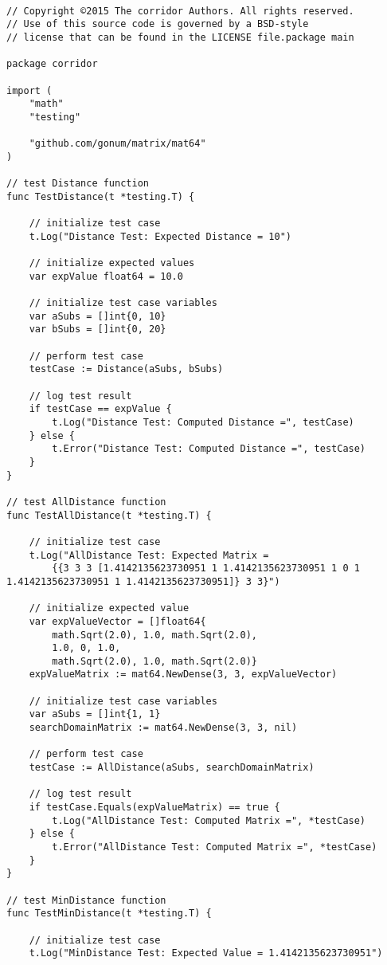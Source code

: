 \begin{lstlisting}[basicstyle=\tiny]

// Copyright ©2015 The corridor Authors. All rights reserved.
// Use of this source code is governed by a BSD-style
// license that can be found in the LICENSE file.package main

package corridor

import (
	"math"
	"testing"

	"github.com/gonum/matrix/mat64"
)

// test Distance function
func TestDistance(t *testing.T) {

	// initialize test case
	t.Log("Distance Test: Expected Distance = 10")

	// initialize expected values
	var expValue float64 = 10.0

	// initialize test case variables
	var aSubs = []int{0, 10}
	var bSubs = []int{0, 20}

	// perform test case
	testCase := Distance(aSubs, bSubs)

	// log test result
	if testCase == expValue {
		t.Log("Distance Test: Computed Distance =", testCase)
	} else {
		t.Error("Distance Test: Computed Distance =", testCase)
	}
}

// test AllDistance function
func TestAllDistance(t *testing.T) {

	// initialize test case
	t.Log("AllDistance Test: Expected Matrix = 
	    {{3 3 3 [1.4142135623730951 1 1.4142135623730951 1 0 1 1.4142135623730951 1 1.4142135623730951]} 3 3}")

	// initialize expected value
	var expValueVector = []float64{
		math.Sqrt(2.0), 1.0, math.Sqrt(2.0),
		1.0, 0, 1.0,
		math.Sqrt(2.0), 1.0, math.Sqrt(2.0)}
	expValueMatrix := mat64.NewDense(3, 3, expValueVector)

	// initialize test case variables
	var aSubs = []int{1, 1}
	searchDomainMatrix := mat64.NewDense(3, 3, nil)

	// perform test case
	testCase := AllDistance(aSubs, searchDomainMatrix)

	// log test result
	if testCase.Equals(expValueMatrix) == true {
		t.Log("AllDistance Test: Computed Matrix =", *testCase)
	} else {
		t.Error("AllDistance Test: Computed Matrix =", *testCase)
	}
}

// test MinDistance function
func TestMinDistance(t *testing.T) {

	// initialize test case
	t.Log("MinDistance Test: Expected Value = 1.4142135623730951")


\end{lstlisting}
